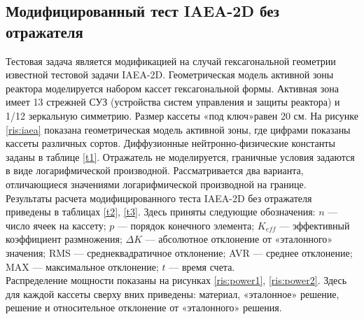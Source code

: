 \subsection{Модифицированный тест IAEA-2D без отражателя}
\label{s-4-1}
Тестовая задача является модификацией на случай гексагональной геометрии известной тестовой задачи IAEA-2D\cite{chao}. Геометрическая модель активной зоны реактора моделируется набором кассет гексагональной формы.  Активная зона имеет 13 стрежней СУЗ (устройства систем управления и защиты реактора) и 1/12 зеркальную симметрию. Размер кассеты «под ключ»\;равен 20 см. На рисунке \ref{ris:iaea} показана геометрическая модель активной зоны, где цифрами показаны кассеты различных сортов. Диффузионные нейтронно-физические константы заданы в таблице \ref{t1}. Отражатель не моделируется, граничные условия задаются в виде логарифмической производной.   Рассматривается два варианта, отличающиеся значениями логарифмической производной на границе. \\ Результаты расчета модифицированного теста IAEA-2D без отражателя приведены в таблицах \ref{t2}, \ref{t3}. Здесь приняты следующие обозначения: $n$ --- число ячеек на кассету; $p$ --- порядок конечного элемента; $K_{eff}$ --- эффективный коэффициент размножения; $\Delta K$ --- абсолютное отклонение от «эталонного» значения; RMS --- среднеквадратичное отклонение; AVR --- среднее отклонение; MAX --- максимальное отклонение; $t$ --- время счета.\\
Распределение мощности показаны на рисунках \ref{ris:power1}, \ref{ris:power2}. Здесь для каждой кассеты сверху вних приведены: материал, «эталонное» решение, решение и относительное отклонение от «эталонного» решения.


